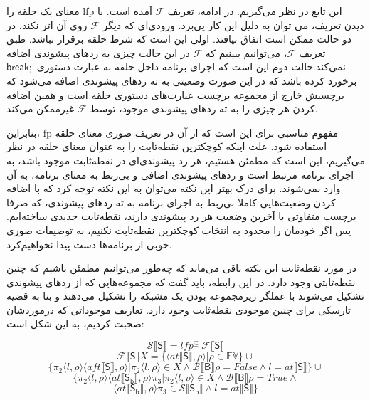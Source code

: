 \begin{defn}
	معنای یک حلقه را \gls{lfp} این تابع در نظر می‌گیریم. در ادامه، تعریف $\mathcal{F} $ آمده است. با دیدن تعریف، می توان به دلیل این کار پی‌برد. ورودی‌ای که دیگر $\mathcal{F} $ روی آن اثر نکند، در دو حالت ممکن است اتفاق بیافتد. اولی این است که شرط حلقه برقرار نباشد. طبق تعریف $\mathcal{F} $،  می‌توانیم ببینیم که $\mathcal{F} $  در این حالت چیزی به ردهای پیشوندی اضافه نمی‌کند.حالت دوم این است که اجرای برنامه داخل حلقه به عبارت‌ دستوری $\mathsf{break;}$ برخورد کرده باشد که در این صورت وضعیتی به ته ردهای پیشوندی اضافه می‌شود که برچسبش خارج از مجموعه برچسب عبارت‌های دستوری حلقه است و همین اضافه کردن هر چیزی را به ته ردهای پیشوندی موجود، توسط $\mathcal{F} $  غیرممکن می‌کند. 
	
	بنابراین، \gls{fp} مفهوم مناسبی برای این است که از آن در تعریف صوری معنای حلقه استفاده شود. علت اینکه کوچکترین نقطه‌ثابت را به عنوان معنای حلقه در نظر می‌گیریم، این است که مطمئن هستیم، هر رد پیشوندی‌ای در نقطه‌ثابت موجود باشد، به اجرای برنامه مرتبط است و ردهای پیشوندی اضافی و بی‌ربط به معنای برنامه، به آن وارد نمی‌شوند. برای درک بهتر این نکته می‌توان به این نکته توجه کرد که با اضافه کردن وضعیت‌هایی کاملا بی‌ربط به اجرای برنامه به ته رد‌های پیشوندی، که صرفا برچسب متفاوتی با آخرین وضعیت هر رد پیشوندی دارند، نقطه‌ثابت جدیدی ساخته‌ایم. پس اگر خودمان را محدود به انتخاب کوچکترین نقطه‌ثابت نکنیم، به توصیفات صوری خوبی از برنامه‌ها دست پیدا نخواهیم‌کرد. 
	
	در مورد نقطه‌ثابت این نکته باقی می‌ماند که چه‌طور می‌توانیم مطمئن باشیم که چنین نقطه‌ثابتی وجود دارد. در این رابطه، باید گفت که مجموعه‌هایی که از ردهای پیشوندی تشکیل می‌شوند با عملگر زیرمجموعه بودن یک مشبکه را تشکیل می‌دهند و بنا به قضیه تارسکی\cite{tarski} برای چنین موجودی نقطه‌ثابت وجود دارد.
	تعاریف موجوداتی که درموردشان صحبت کردیم، به این شکل است:
	
	$$\mathcal{S} \llbracket\mathsf{S}\rrbracket = lfp^{\subseteq}\: \mathcal{F\llbracket\mathsf{S}\rrbracket}      $$ $$\mathcal{F} \llbracket\mathsf{S}\rrbracket X= \{ \langle at\llbracket\mathsf{S}\rrbracket , \rho \rangle | \rho \in \mathbb{EV}       \} \cup $$
	$$  \{ \pi_2 \langle l ,\rho \rangle \langle aft\llbracket\mathsf{S}\rrbracket,\rho \rangle |  \pi_2 \langle l ,\rho \rangle \in X \wedge \mathcal{B}\llbracket\mathsf{B}\rrbracket\rho=False \wedge l= at\llbracket\mathsf{S}\rrbracket   \} \cup      $$
	$$  \{ \pi_2 \langle l ,\rho \rangle \langle at\llbracket\mathsf{S_b}\rrbracket,\rho \rangle \pi_3 |  \pi_2 \langle l ,\rho \rangle \in X \wedge \mathcal{B}\llbracket\mathsf{B}\rrbracket\rho=True \wedge$$$$  \langle at\llbracket\mathsf{S_b}\rrbracket,\rho \rangle \pi_3 \in  \mathcal{S} \llbracket\mathsf{S_b}\rrbracket   \wedge   l= at\llbracket\mathsf{S}\rrbracket  \}  $$\\
	

\end{defn}
